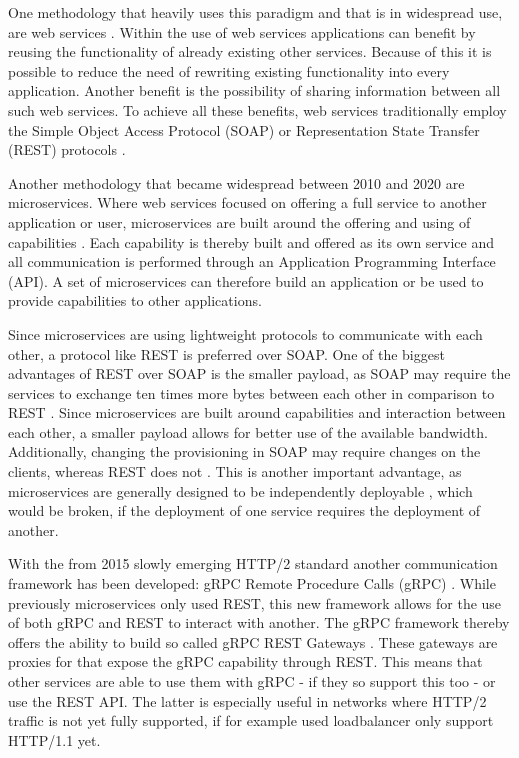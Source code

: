 \documentclass[conference]{IEEEtran}
\begin{document}
One methodology that heavily uses this paradigm and that is in widespread use, are web services \cite{halili2018web}. Within the use of web services applications can benefit by reusing the functionality of already existing other services. Because of this it is possible to reduce the need of rewriting existing functionality into every application. Another benefit is the possibility of sharing information between all such web services. To achieve all these benefits, web services traditionally employ the Simple Object Access Protocol (SOAP) or Representation State Transfer (REST) protocols \cite{halili2018web}.

Another methodology that became widespread between 2010 and 2020 are microservices. Where web services focused on offering a full service to another application or user, microservices are built around the offering and using of capabilities \cite{karmel2016nist}. Each capability is thereby built and offered as its own service and all communication is performed through an Application Programming Interface (API). A set of microservices can therefore build an application or be used to provide capabilities to other applications.

Since microservices are using lightweight protocols \cite{karmel2016nist} to communicate with each other, a protocol like REST is preferred over SOAP. One of the biggest advantages of REST over SOAP is the smaller payload, as SOAP may require the services to exchange ten times more bytes between each other in comparison to REST \cite{halili2018web}. Since microservices are built around capabilities and interaction between each other, a smaller payload allows for better use of the available bandwidth.
Additionally, changing the provisioning in SOAP may require changes on the clients, whereas REST does not \cite{halili2018web}. This is another important advantage, as microservices are generally designed to be independently deployable \cite{karmel2016nist}, which would be broken, if the deployment of one service requires the deployment of another.

With the from 2015 slowly emerging HTTP/2 standard \cite{rfc7540} another communication framework has been developed: gRPC Remote Procedure Calls (gRPC) \cite{GRPCAuthors2020}. While previously microservices only used REST, this new framework allows for the use of both gRPC and REST to interact with another. The gRPC framework thereby offers the ability to build so called gRPC REST Gateways \cite{grpcrest}. These gateways are proxies for that expose the gRPC capability through REST. This means that other services are able to use them with gRPC - if they so support this too - or use the REST API. The latter is especially useful in networks where HTTP/2 traffic is not yet fully supported, if for example used loadbalancer only support HTTP/1.1 yet.
\end{document}
